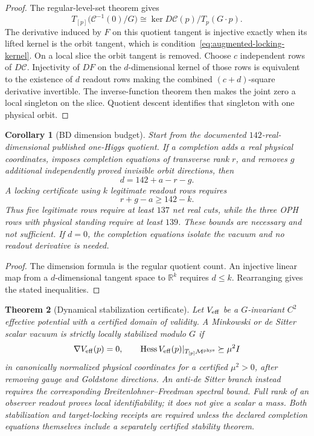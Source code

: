 \documentclass[11pt]{article}
\newtheorem{theorem}{Theorem}[section]
\newtheorem{corollary}[theorem]{Corollary}
\theoremstyle{remark}
\theoremstyle{plain}
\begin{document}
\begin{proof}
The regular-level-set theorem gives
\[
T_{[p]}\bigl(\mathcal C^{-1}(0)/G\bigr)
\cong
\ker D\mathcal C(p)/T_p(G\!\cdot p).
\]
The derivative induced by \(F\) on this quotient tangent is injective exactly when its lifted
kernel is the orbit tangent, which is condition~\eqref{eq:augmented-locking-kernel}. On a local slice the orbit tangent is
removed. Choose \(c\) independent rows of \(D\mathcal C\). Injectivity of \(DF\) on the
\(d\)-dimensional kernel of those rows is equivalent to the existence of \(d\) readout rows making
the combined \((c+d)\)-square derivative invertible. The inverse-function theorem then makes the
joint zero a local singleton on the slice. Quotient descent identifies that singleton with one
physical orbit.
\end{proof}

\begin{corollary}[BD dimension budget]
Start from the documented \(142\)-real-dimensional published one-Higgs quotient. If a completion
adds \(a\) real physical coordinates, imposes completion equations of transverse rank \(r\), and
removes \(g\) additional independently proved invisible orbit directions, then
\[
d=142+a-r-g.
\]
A locking certificate using \(k\) legitimate readout rows requires
\[
r+g-a\ge 142-k.
\]
Thus five legitimate rows require at least \(137\) net real cuts, while the three
OPH rows with physical standing require at least \(139\). These bounds are necessary and not sufficient. If
\(d=0\), the completion equations isolate the vacuum and no readout derivative is needed.
\end{corollary}

\begin{proof}
The dimension formula is the regular quotient count. An injective linear map from a
\(d\)-dimensional tangent space to \(\mathbb R^k\) requires \(d\le k\). Rearranging gives the
stated inequalities.
\end{proof}

\begin{theorem}[Dynamical stabilization certificate]
\label{thm:dynamical-stabilization}
Let \(V_{\rm eff}\) be a \(G\)-invariant \(C^2\) effective potential with a certified domain of
validity. A Minkowski or de Sitter scalar vacuum is strictly locally stabilized modulo \(G\) if
\[
\nabla V_{\rm eff}(p)=0,
\qquad
\operatorname{Hess}V_{\rm eff}(p)|_{T_{[p]}\mathcal M^{\rm phys}}
\succeq \mu^2 I
\]
in canonically normalized physical coordinates for a certified \(\mu^2>0\), after removing gauge
and Goldstone directions. An anti-de Sitter branch instead requires the corresponding
Breitenlohner--Freedman spectral bound. Full rank of an observer readout proves local
identifiability; it does not give a scalar a mass. Both stabilization and target-locking receipts
are required unless the declared completion equations themselves include a separately certified
stability theorem.
\end{theorem}
\end{document}

